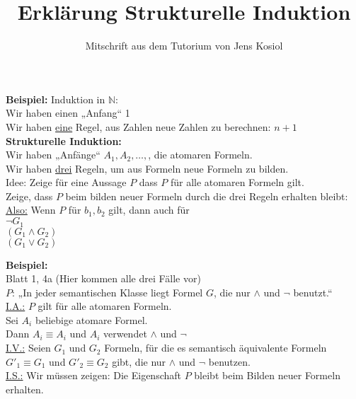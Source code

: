 \documentclass[a4paper]{scrartcl}
\begin{document}
\title{Erklärung Strukturelle Induktion}
\subtitle{Mitschrift aus dem Tutorium von Jens Kosiol}
\maketitle

\textbf{Beispiel:} Induktion in $\mathbb{N}$:\\
Wir haben einen „Anfang“ 1\\
Wir haben \underline{eine} Regel, aus Zahlen neue Zahlen zu berechnen: $n+1$\\


\textbf{Strukturelle Induktion:}\\
Wir haben „Anfänge“ $A_1, A_2, …, $, die atomaren Formeln.\\
Wir haben \underline{drei} Regeln, um aus Formeln neue Formeln zu bilden.\\

Idee: Zeige für eine Aussage $P$ dass $P$ für alle atomaren Formeln gilt.\\

Zeige, dass $P$ beim bilden neuer Formeln durch die drei Regeln erhalten bleibt:\\

\underline{Also:} Wenn $P$ für $b_1, b_2$ gilt, dann auch für\\
$\neg G_1$\\
$(G_1 \wedge G_2)$\\
$(G_1 \vee G_2)$\\

\newpage

\textbf{Beispiel:}\\
Blatt 1, 4a (Hier kommen alle drei Fälle vor)\\
$P$: „In jeder semantischen Klasse liegt Formel $G$, die nur $\wedge$ und $\neg$ benutzt.“\\
\underline{I.A.:} $P$ gilt für alle atomaren Formeln.\\
Sei $A_i$ beliebige atomare Formel.\\
Dann $A_i \equiv A_i$ und $A_i$ verwendet $\wedge$ und $\neg$\\
\underline{I.V.:} Seien $G_1$ und $G_2$ Formeln, für die es semantisch äquivalente Formeln $G'_1 \equiv G_1$ und $G'_2 \equiv G_2$ gibt, die nur $\wedge$ und $\neg$ benutzen.\\
\underline{I.S.:} Wir müssen zeigen: Die Eigenschaft $P$ bleibt beim Bilden neuer Formeln erhalten.\\
\end{document}
